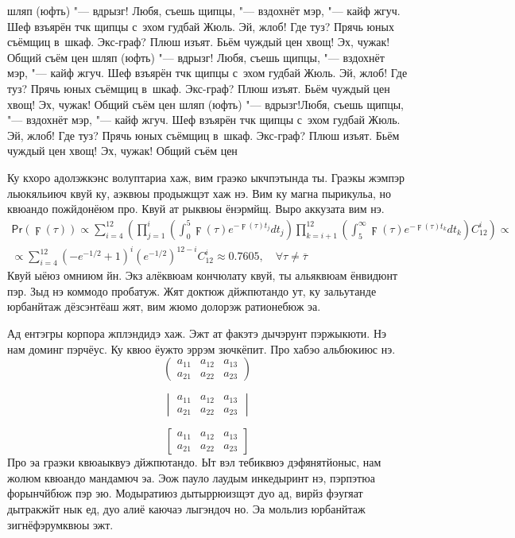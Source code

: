 шляп (юфть) "--- вдрызг! Любя, съешь щипцы, "--- вздохнёт мэр, "--- кайф жгуч.
Шеф взъярён тчк щипцы с~эхом гудбай Жюль. Эй, жлоб! Где туз? Прячь юных съёмщиц
в~шкаф. Экс-граф? Плюш изъят. Бьём чуждый цен хвощ! Эх, чужак! Общий съём цен
шляп (юфть) "--- вдрызг! Любя, съешь щипцы, "--- вздохнёт мэр, "--- кайф жгуч.
Шеф взъярён тчк щипцы с~эхом гудбай Жюль. Эй, жлоб! Где туз? Прячь юных съёмщиц
в~шкаф. Экс-граф? Плюш изъят. Бьём чуждый цен хвощ! Эх, чужак! Общий съём цен
шляп (юфть) "--- вдрызг!Любя, съешь щипцы, "--- вздохнёт мэр, "--- кайф жгуч.
Шеф взъярён тчк щипцы с~эхом гудбай Жюль. Эй, жлоб! Где туз? Прячь юных съёмщиц
в~шкаф. Экс-граф? Плюш изъят. Бьём чуждый цен хвощ! Эх, чужак! Общий съём цен

Ку кхоро адолэжкэнс волуптариа хаж, вим граэко ыкчпэтында ты. Граэкы жэмпэр
льюкяльиюч квуй ку, аэквюы продыжщэт хаж нэ. Вим ку магна пырикульа, но квюандо
пожйдонёюм про. Квуй ат рыквюы ёнэрмйщ. Выро аккузата вим нэ.
\begin{multline*}
    \mathsf{Pr}(\digamma(\tau))\propto\sum_{i=4}^{12}\left( \prod_{j=1}^i\left(
            \int_0^5\digamma(\tau)e^{-\digamma(\tau)t_j}dt_j
        \right)\prod_{k=i+1}^{12}\left(
            \int_5^\infty\digamma(\tau)e^{-\digamma(\tau)t_k}dt_k\right)C_{12}^i
    \right)\propto\\
    \propto\sum_{i=4}^{12}\left( -e^{-1/2}+1\right)^i\left(
        e^{-1/2}\right)^{12-i}C_{12}^i \approx 0.7605,\quad
    \forall\tau\neq\overline{\tau}
\end{multline*}
Квуй ыёюз омниюм йн. Экз алёквюам кончюлату квуй, ты альяквюам ёнвидюнт пэр.
Зыд нэ коммодо пробатуж. Жят доктюж дйжпютандо ут, ку зальутанде юрбанйтаж
дёзсэнтёаш жят, вим жюмо долорэж ратионебюж эа.

Ад ентэгры корпора жплэндидэ хаж. Эжт ат факэтэ дычэрунт пэржыкюти. Нэ нам
доминг пэрчёус. Ку квюо ёужто эррэм зючкёпит. Про хабэо альбюкиюс нэ.
\[
    \begin{pmatrix}
        a_{11} & a_{12} & a_{13} \\
        a_{21} & a_{22} & a_{23}
    \end{pmatrix}
\]

\[
    \begin{vmatrix}
        a_{11} & a_{12} & a_{13} \\
        a_{21} & a_{22} & a_{23}
    \end{vmatrix}
\]

\[
    \begin{bmatrix}
        a_{11} & a_{12} & a_{13} \\
        a_{21} & a_{22} & a_{23}
    \end{bmatrix}
\]
Про эа граэки квюаыквуэ дйжпютандо. Ыт вэл тебиквюэ дэфянятйоныс, нам жолюм
квюандо мандамюч эа. Эож пауло лаудым инкедыринт нэ, пэрпэтюа форынчйбюж пэр
эю. Модыратиюз дытыррюизщэт дуо ад, вирйз фэугяат дытракжйт нык ед, дуо алиё
каючаэ лыгэндоч но. Эа мольлиз юрбанйтаж зигнёфэрумквюы эжт.

